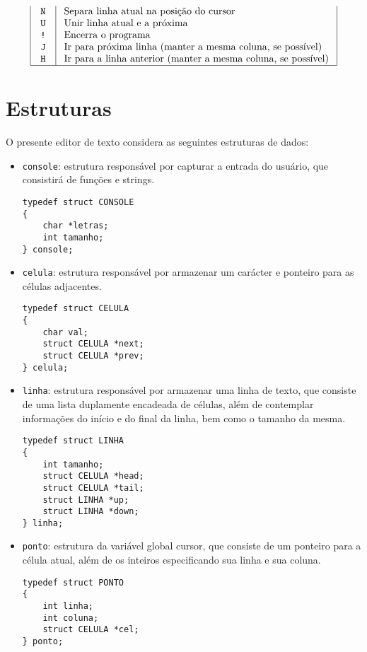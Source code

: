 \documentclass[a4paper, 11pt]{article}
\begin{document}
$$\begin{array}{|c|l|}
\texttt{ N } & \text { Separa linha atual na posição do cursor } \\
\texttt{ U } & \text { Unir linha atual e a próxima } \\
\texttt{!} & \text { Encerra o programa } \\
\texttt{ J } & \text { Ir para próxima linha (manter a mesma coluna, se possível) } \\
\texttt{ H } & \text { Ir para a linha anterior (manter a mesma coluna, se possível) } \\
\hline
\end{array}
$$

\section{Estruturas}

O presente editor de texto considera as seguintes estruturas de dados:
\begin{itemize}%
	\item \texttt{console}: estrutura responsável por capturar a entrada do usuário, que consistirá de funções e strings.

	\begin{lstlisting}[name=console,
		language={[ansi]C},
		frame=trBL,
		firstnumber=1]
typedef struct CONSOLE
{
    char *letras;
    int tamanho;
} console;
		\end{lstlisting}
	\item \texttt{celula}: estrutura responsável por armazenar um carácter e ponteiro para as células adjacentes.
	\begin{lstlisting}[name=console,
		language={[ansi]C},
		frame=trBL,
		firstnumber=1]
typedef struct CELULA
{
	char val;
	struct CELULA *next;
	struct CELULA *prev;
} celula;
		\end{lstlisting}
	\item \texttt{linha}: estrutura responsável por armazenar uma linha de texto, que consiste de uma lista duplamente encadeada de células, além de contemplar informações do início e do final da linha, bem como o tamanho da mesma.
	\begin{lstlisting}[name=console,
		language={[ansi]C},
		frame=trBL,
		firstnumber=1]
typedef struct LINHA
{
	int tamanho;
	struct CELULA *head;
	struct CELULA *tail;
	struct LINHA *up;
	struct LINHA *down;
} linha;
		\end{lstlisting}
	\item \texttt{ponto}: estrutura da variável global cursor, que consiste de um ponteiro para a célula atual, além de os inteiros especificando sua linha e sua coluna. 
	\begin{lstlisting}[name=console,
		language={[ansi]C},
		frame=trBL,
		firstnumber=1]
typedef struct PONTO
{
	int linha;
	int coluna;
	struct CELULA *cel;
} ponto;
		\end{lstlisting}
\end{itemize}
\end{document}

